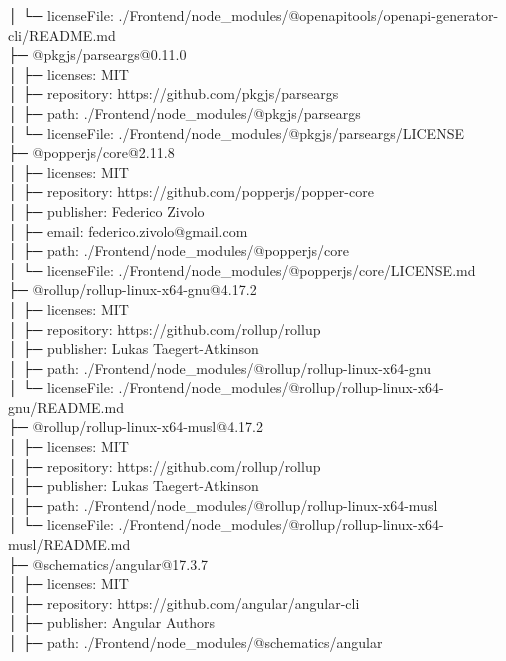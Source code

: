 │  └─ licenseFile: ./Frontend/node\_modules/@openapitools/openapi-generator-cli/README.md\\
├─ @pkgjs/parseargs@0.11.0\\
│  ├─ licenses: MIT\\
│  ├─ repository: https://github.com/pkgjs/parseargs\\
│  ├─ path: ./Frontend/node\_modules/@pkgjs/parseargs\\
│  └─ licenseFile: ./Frontend/node\_modules/@pkgjs/parseargs/LICENSE\\
├─ @popperjs/core@2.11.8\\
│  ├─ licenses: MIT\\
│  ├─ repository: https://github.com/popperjs/popper-core\\
│  ├─ publisher: Federico Zivolo\\
│  ├─ email: federico.zivolo@gmail.com\\
│  ├─ path: ./Frontend/node\_modules/@popperjs/core\\
│  └─ licenseFile: ./Frontend/node\_modules/@popperjs/core/LICENSE.md\\
├─ @rollup/rollup-linux-x64-gnu@4.17.2\\
│  ├─ licenses: MIT\\
│  ├─ repository: https://github.com/rollup/rollup\\
│  ├─ publisher: Lukas Taegert-Atkinson\\
│  ├─ path: ./Frontend/node\_modules/@rollup/rollup-linux-x64-gnu\\
│  └─ licenseFile: ./Frontend/node\_modules/@rollup/rollup-linux-x64-gnu/README.md\\
├─ @rollup/rollup-linux-x64-musl@4.17.2\\
│  ├─ licenses: MIT\\
│  ├─ repository: https://github.com/rollup/rollup\\
│  ├─ publisher: Lukas Taegert-Atkinson\\
│  ├─ path: ./Frontend/node\_modules/@rollup/rollup-linux-x64-musl\\
│  └─ licenseFile: ./Frontend/node\_modules/@rollup/rollup-linux-x64-musl/README.md\\
├─ @schematics/angular@17.3.7\\
│  ├─ licenses: MIT\\
│  ├─ repository: https://github.com/angular/angular-cli\\
│  ├─ publisher: Angular Authors\\
│  ├─ path: ./Frontend/node\_modules/@schematics/angular\\
